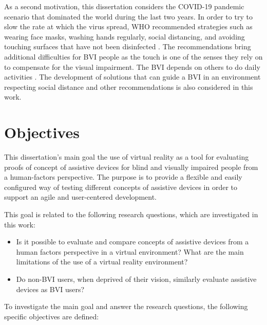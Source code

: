 As a second motivation, this dissertation considers the COVID-19 pandemic scenario that dominated the world during the last two years. In order to try to slow the rate at which the virus spread, WHO recommended strategies such as wearing face masks, washing hands regularly, social distancing, and avoiding touching surfaces that have not been disinfected \cite{who_2020}. The recommendations bring additional difficulties for BVI people as the touch is one of the senses they rely on to compensate for the visual impairment. The BVI depends on others to do daily activities \cite{jondani2021strategies}. The development of solutions that can guide a BVI in an environment respecting social distance and other recommendations is also considered in this work.

\section{Objectives}
\label{sec:objetivos}

    

 This dissertation's main goal the use of virtual reality as a tool for evaluating proofs of concept of assistive devices for blind and visually impaired people from a human-factors perspective. The purpose is to provide a flexible and easily configured way of testing different concepts of assistive devices in order to support an agile and user-centered development.

 This goal is related to the following research questions, which are investigated in this work:

 \begin{itemize}
    \item Is it possible to evaluate and compare concepts of assistive devices from a human factors perspective in a virtual environment? What are the main limitations of the use of a virtual reality environment? \label{itm:obj_first}
    \item Do non-BVI users, when deprived of their vision, similarly evaluate assistive devices as BVI users? \label{itm:obj_second}
\end{itemize}
  
 To investigate the main goal and answer the research questions, the following specific objectives are defined:
 
